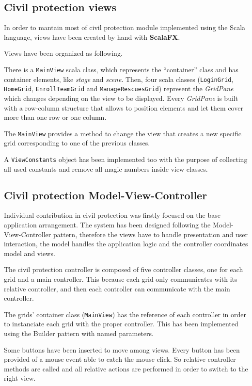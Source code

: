 \documentclass[a4paper,12pt]{report}
\begin{document}
\subsection{Civil protection views}
In order to mantain most of civil protection module implemented using the Scala language, views have been created by hand with \textbf{ScalaFX}. 

Views have been organized as following.

There is a \texttt{MainView} scala class, which represents the ``container'' class and has container elements, like \textit{stage} and \textit{scene}.
Then, four scala classes (\texttt{LoginGrid}, \texttt{HomeGrid}, \texttt{EnrollTeamGrid} and \texttt{ManageRescuesGrid}) represent the \textit{GridPane} which changes depending on the view to be displayed.
Every \textit{GridPane} is built with a row-column structure that allows to position elements and let them cover more than one row or one column.

The \texttt{MainView} provides a method to change the view that creates a new specific grid corresponding to one of the previous classes.

A \texttt{ViewConstants} object has been implemented too with the purpose of collecting all used constants and remove all magic numbers inside view classes.

\subsection{Civil protection Model-View-Controller}
Individual contribution in civil protection was firstly focused on the base application arrangement. The system has been designed following the Model-View-Controller pattern, therefore the views have to handle presentation and user interaction, the model handles the application logic and the controller coordinates model and views.

The civil protection controller is composed of five controller classes, one for each grid and a main controller. This because each grid only communicates with its relative controller, and then each controller can communicate with the main controller.

The grids' container class (\texttt{MainView}) has the reference of each controller in order to instanciate each grid with the proper controller. This has been implemented using the Builder pattern with named parameters.

Some buttons have been inserted to move among views. Every button has been provided of a mouse event able to catch the mouse click. So relative controller methods are called and all relative actions are performed in order to switch to the right view.
\end{document}
